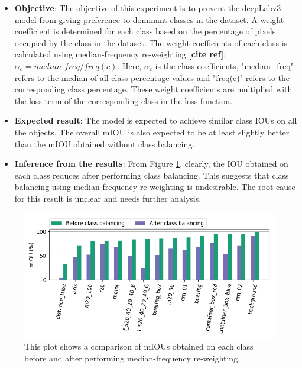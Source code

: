 	\begin{itemize}
		\item \textbf{Objective}: The objective of this experiment is to prevent the deepLabv3+ model from giving preference to dominant classes in the dataset. A weight coefficient is determined for each class based on the percentage of pixels occupied by the class in the dataset. The weight coefficients of each class is calculated using median-frequency re-weighting \textbf{[cite ref]}: $\alpha_c = median\_freq/freq(c)$. Here, $\alpha_c$ is the class coefficients, "median\_freq" refers to the median of all class percentage values and "freq(c)" refers to the corresponding class percentage. These weight coefficients are multiplied with the loss term of the corresponding class in the loss function.
		\item \textbf{Expected result}: The model is expected to achieve similar class IOUs on all the objects. The overall mIOU is also expected to be at least slightly better than the mIOU obtained without class balancing.
		\item \textbf{Inference from the results}: From Figure \ref{Fig:clsbal}, clearly, the IOU obtained on each class reduces after performing class balancing. This suggests that class balancing using median-frequency re-weighting is undesirable. The root cause for this result is unclear and needs further analysis.
	\end{itemize}
	
	\begin{figure}
		\centering
		\includegraphics[width=1\linewidth]{images/cls_bal_comp}
		\caption{This plot shows a comparison of mIOUs obtained on each class before and after performing median-frequency re-weighting.}
		\label{Fig:clsbal}
	\end{figure}

